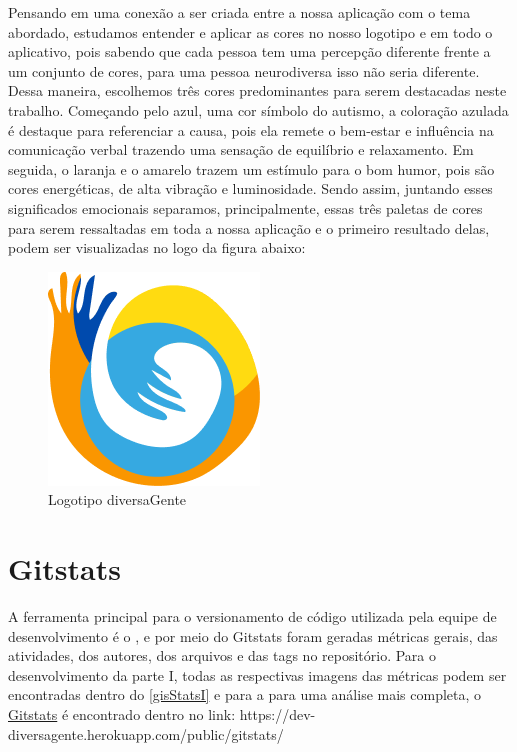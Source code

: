 Pensando em uma conexão a ser criada entre a nossa aplicação com o tema abordado, estudamos entender e aplicar as cores no nosso logotipo e em todo o aplicativo, pois sabendo que  cada pessoa tem uma percepção diferente frente a um conjunto de cores, para uma pessoa neurodiversa isso não seria diferente. Dessa maneira, escolhemos três cores predominantes para serem destacadas neste trabalho. Começando pelo azul, uma cor símbolo do autismo, a coloração azulada é destaque para referenciar a causa, pois ela remete o bem-estar e influência na comunicação verbal trazendo uma sensação de equilíbrio e relaxamento. Em seguida, o laranja e o amarelo trazem um estímulo para o bom humor, pois são cores energéticas, de alta vibração e luminosidade. Sendo assim, juntando esses significados emocionais separamos, principalmente, essas três paletas de cores para serem ressaltadas em toda a nossa aplicação e o primeiro resultado delas, podem ser visualizadas no logo da figura abaixo: 

\begin{figure}[htb]
	\centering
	\caption{\label{fig_arq_virado} Logotipo diversaGente}
	\includegraphics[width=0.5\textwidth]{anexos/logoDiversagente.png}
\end{figure}

\pagebreak


\section{Gitstats}

A ferramenta principal para o versionamento de código utilizada pela equipe de desenvolvimento é o , e por meio do Gitstats foram geradas métricas gerais, das atividades, dos autores, dos arquivos e das tags no repositório. Para o desenvolvimento da parte I, todas as respectivas imagens das métricas podem ser encontradas dentro do \autoref{gisStatsI} e para a para uma análise mais completa, o 
\href{https://dev-diversagente.herokuapp.com/public/gitstats/}{Gitstats} é encontrado dentro no link: https://dev-diversagente.herokuapp.com/public/gitstats/


